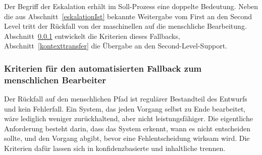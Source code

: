 Der Begriff der Eskalation erh\"alt im Soll-Prozess eine doppelte Bedeutung. Neben die aus Abschnitt~\ref{eskalationIst} bekannte Weitergabe vom First an den Second Level tritt der R\"uckfall von der maschinellen auf die menschliche Bearbeitung. Abschnitt~\ref{fallback} entwickelt die Kriterien dieses Fallbacks, Abschnitt~\ref{kontexttransfer} die \"Ubergabe an den Second-Level-Support.

\subsubsection{Kriterien für den automatisierten Fallback zum menschlichen Bearbeiter}
\label{fallback}

Der R\"uckfall auf den menschlichen Pfad ist regul\"arer Bestandteil des Entwurfs und kein Fehlerfall. Ein System, das jeden Vorgang selbst zu Ende bearbeitet, w\"are lediglich weniger zur\"uckhaltend, aber nicht leistungsf\"ahiger. Die eigentliche Anforderung besteht darin, dass das System erkennt, wann es nicht entscheiden sollte, und den Vorgang abgibt, bevor eine Fehlentscheidung wirksam wird. Die Kriterien daf\"ur lassen sich in konfidenzbasierte und inhaltliche trennen.

